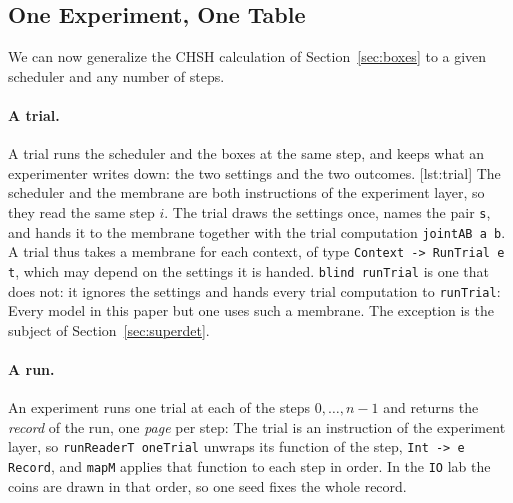 \documentclass[11pt]{article}
\newcommand{\hs}{\lstinline[style=hask,basicstyle=\ttfamily,frame=none]}
\begin{document}
\subsection{One Experiment, One Table}\label{sec:run}

We can now generalize the CHSH calculation of Section~\ref{sec:boxes} to a given scheduler and any number of steps.

\paragraph{A trial.} A trial runs the scheduler and the boxes at the same step, and keeps what an experimenter writes down: the two settings and the two outcomes.
[lst:trial]
The scheduler and the membrane are both instructions of the experiment layer, so they read the same step $i$. The trial draws the settings once, names the pair \hs|s|, and hands it to the membrane together with the trial computation \hs|jointAB a b|. A trial thus takes a membrane for each context, of type \hs|Context -> RunTrial e t|, which may depend on the settings it is handed. \hs|blind runTrial| is one that does not: it ignores the settings and hands every trial computation to \hs|runTrial|:
Every model in this paper but one uses such a membrane. The exception is the subject of Section~\ref{sec:superdet}.

\paragraph{A run.} An experiment runs one trial at each of the steps $0, \ldots, n-1$ and returns the \emph{record} of the run, one \emph{page} per step:
The trial is an instruction of the experiment layer, so \hs|runReaderT oneTrial| unwraps its function of the step, \hs|Int -> e Record|, and \hs|mapM| applies that function to each step in order. In the \hs|IO| lab the coins are drawn in that order, so one seed fixes the whole record.
\end{document}
